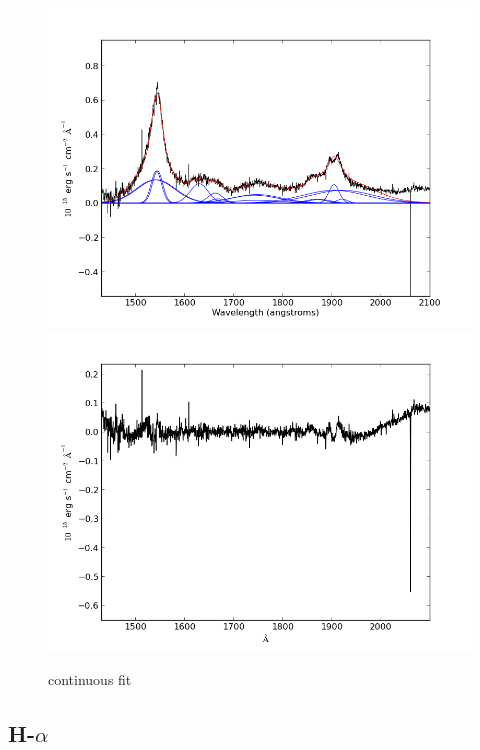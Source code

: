 \documentclass[usenatbib]{mn2e}
\begin{document}
\newpage


\begin{figure}
\begin{center}
\includegraphics[width=0.46\linewidth,angle=0]{C_16.png}\\
\vspace{5mm}
\includegraphics[width=0.49\linewidth,angle=0]{C_res_16.png}\\
\end{center} 
\caption{continuous fit \label{fig:landscape}}   
\end{figure}

\newpage





\subsection{H-$\alpha$}
\end{document}
